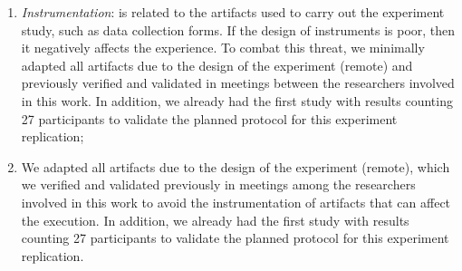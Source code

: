 \begin{enumerate} [label=\roman*.]
    \item \textit{Instrumentation}: 
    is related to the artifacts used to carry out the experiment study, such as data collection forms. 
    If the design of instruments is poor, then it negatively affects the experience.
    To combat this threat, we minimally adapted all artifacts due to the design of the experiment (remote) and previously verified and validated in meetings between the researchers involved in this work.
    In addition, we already had the first study with results counting 27 participants to validate the planned protocol for this experiment replication;
    
    \item We adapted all artifacts due to the design of the experiment (remote), which we verified and validated previously in meetings among the researchers involved in this work to avoid the instrumentation of artifacts that can affect the execution.
    In addition, we already had the first study with results counting 27 participants to validate the planned protocol for this experiment replication.
\end{enumerate}

